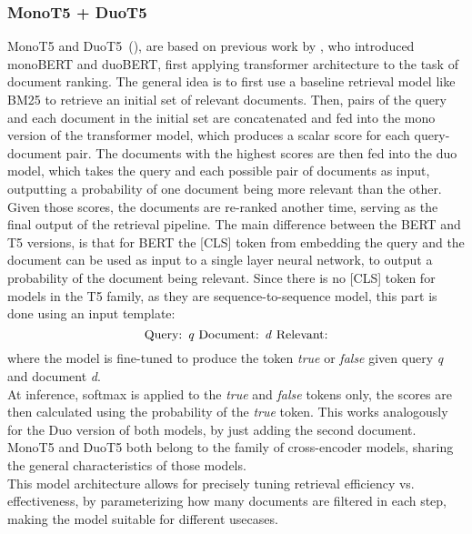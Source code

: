 \subsubsection{MonoT5 + DuoT5}\label{sec:monot5-duot5}
MonoT5 and DuoT5~(\cite{roberts:2019:Exploring}), are based on previous work by \cite{nogueira:2019:Multi}, who introduced monoBERT and duoBERT, first applying transformer architecture to the task of document ranking.
The general idea is to first use a baseline retrieval model like BM25 to retrieve an initial set of relevant documents.
Then, pairs of the query and each document in the initial set are concatenated and fed into the mono version of the transformer model, which produces a scalar score for each query-document pair.
The documents with the highest scores are then fed into the duo model, which takes the query and each possible pair of documents as input, outputting a probability of one document being more relevant than the other.
Given those scores, the documents are re-ranked another time, serving as the final output of the retrieval pipeline.
The main difference between the BERT and T5 versions, is that for BERT the [CLS] token from embedding the query and the document can be used as input to a single layer neural network, to output a probability of the document being relevant.
Since there is no [CLS] token for models in the T5 family, as they are sequence-to-sequence model, this part is done using an input template:
\begin{equation}
    \text{Query: \emph{q} Document: \emph{d} Relevant:}
\end{equation} 
where the model is fine-tuned to produce the token \emph{true} or \emph{false} given query \emph{q} and document \emph{d}.
\\
At inference, softmax is applied to the \emph{true} and \emph{false} tokens only, the scores are then calculated using the probability of the \emph{true} token.
This works analogously for the Duo version of both models, by just adding the second document.
MonoT5 and DuoT5 both belong to the family of cross-encoder models, sharing the general characteristics of those models.
\\
This model architecture allows for precisely tuning retrieval efficiency vs. effectiveness, by parameterizing how many documents are filtered in each step, making the model suitable for different usecases.
\\

